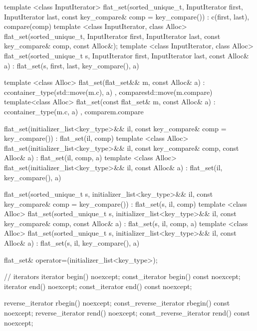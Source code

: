 \begin{codeblock}
\begin{codeblock}
\begin{codeblock}
\begin{addedblock}
\begin{codeblock}
{{    template <class InputIterator>
      flat_set(sorted_unique_t, InputIterator first, InputIterator last,
               const key_compare& comp = key_compare())
        : c(first, last), compare(comp) { }
    template <class InputIterator, class Alloc>
      flat_set(sorted_unique_t, InputIterator first, InputIterator last,
               const key_compare& comp, const Alloc&);
    template <class InputIterator, class Alloc>
      flat_set(sorted_unique_t s, InputIterator first, InputIterator last,
               const Alloc& a)
        : flat_set(s, first, last, key_compare(), a) { }

    template <class Alloc>
      flat_set(flat_set&& m, const Alloc& a)
        : c{container_type(std::move(m.c), a)}
        , compare{std::move(m.compare)}
      { }
    template<class Alloc>
      flat_set(const flat_set& m, const Alloc& a)
        : c{container_type(m.c, a)}
        , compare{m.compare}
      { }

    flat_set(initializer_list<key_type>&& il,
             const key_compare& comp = key_compare())
        : flat_set(il, comp) { }
    template <class Alloc>
      flat_set(initializer_list<key_type>&& il,
               const key_compare& comp, const Alloc& a)
        : flat_set(il, comp, a) { }
    template <class Alloc>
      flat_set(initializer_list<key_type>&& il, const Alloc& a)
        : flat_set(il, key_compare(), a) { }

    flat_set(sorted_unique_t s, initializer_list<key_type>&& il,
             const key_compare& comp = key_compare()) 
        : flat_set(s, il, comp) { }
    template <class Alloc>
      flat_set(sorted_unique_t s, initializer_list<key_type>&& il,
               const key_compare& comp, const Alloc& a) 
        : flat_set(s, il, comp, a) { }
    template <class Alloc>
      flat_set(sorted_unique_t s, initializer_list<key_type>&& il,
               const Alloc& a)
        : flat_set(s, il, key_compare(), a) { }

    flat_set& operator=(initializer_list<key_type>);

    // iterators
    iterator               begin() noexcept;
    const_iterator         begin() const noexcept;
    iterator               end() noexcept;
    const_iterator         end() const noexcept;

    reverse_iterator       rbegin() noexcept;
    const_reverse_iterator rbegin() const noexcept;
    reverse_iterator       rend() noexcept;
    const_reverse_iterator rend() const noexcept;

}}
\end{codeblock}
\end{addedblock}
\end{codeblock}
\end{codeblock}
\end{codeblock}
